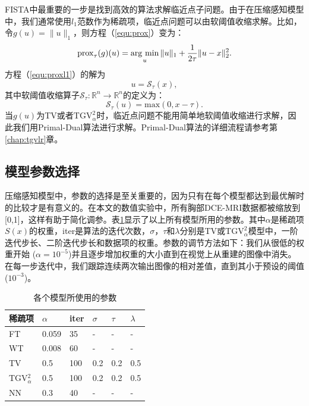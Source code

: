 FISTA中最重要的一步是找到高效的算法求解临近点子问题。由于在压缩感知模型中，我们通常使用$l_1$范数作为稀疏项，临近点问题可以由软阈值收缩求解。比如，令$g(u) = \|u\|_1$，则方程（\ref{equ:prox}）变为：
\begin{equation}
\prox_\tau(g)(u)=\argmin_u{\|u\|_1+\frac{1}{2\tau}}\|u-x\|_2^2.
\label{equ:proxl1}
\end{equation}
方程（\ref{equ:proxl1}）的解为
\begin{equation}
u=\mathscr{S}_{\tau}(x),
\end{equation}
其中软阈值收缩算子$\mathscr{S}_{\tau}:\mathbb{R}^n\xrightarrow{} \mathbb{R}^n$的定义为：
\begin{equation}
\mathscr{S}_{\tau}(u)=
\mathrm{max}(0, x-\tau).
\end{equation}
当$g(u)$为TV或者$\mathrm{TGV}_\alpha^2$时，临近点问题不能用简单地软阈值收缩进行求解，因此我们用Primal-Dual算法进行求解。Primal-Dual算法的详细流程请参考第\ref{chap:tgvlr}章。

\subsection{模型参数选择}
压缩感知模型中，参数的选择是至关重要的，因为只有在每个模型都达到最优解时的比较才是有意义的。在本文的数值实验中，所有胸部DCE-MRI数据都被缩放到[0,1]，这样有助于简化调参。表\ref{tab:params4}显示了以上所有模型所用的参数。其中$\alpha$是稀疏项$S(x)$的权重，iter是算法的迭代次数，$\sigma$，$\tau$和$\lambda$分别是TV或$\mathrm{TGV}_\alpha^2$模型中，一阶迭代步长、二阶迭代步长和数据项的权重。参数的调节方法如下：我们从很低的权重开始 ($\alpha=10^{-5}$)并且逐步增加权重的大小直到在视觉上从重建的图像中消失。在每一步迭代中，我们跟踪连续两次输出图像的相对差值，直到其小于预设的阈值 ($10^{-3}$)。

\begin{table}
\setlength{\belowcaptionskip}{10pt}
\caption{各个模型所使用的参数}
\centering
\begin{tabular}{|l|l|l|l|l|l|}
\hline
\hline
稀疏项 & $\alpha$ & iter & $\sigma$ & $\tau$ & $\lambda$\\
\hline
FT & 0.059 & 35 & - & - & -\\
\hline
WT & 0.008 & 60 & - & - & -\\
\hline
TV & 0.5 & 100 & 0.2 & 0.2 & 0.5\\
\hline
TGV$_{\alpha}^2$ & 0.5 & 100 & 0.2 & 0.2 & 0.5\\
\hline
NN & 0.3 & 40 & - & - & -\\
\hline
\end{tabular}
\label{tab:params4}
\end{table}

